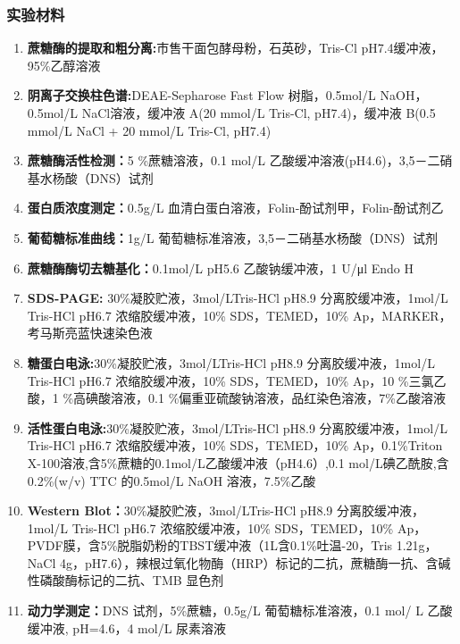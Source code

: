 \subsubsection{实验材料}
\begin{enumerate}
    \item \textbf{蔗糖酶的提取和粗分离:}市售干面包酵母粉，石英砂，Tris-Cl pH7.4缓冲液，95\%乙醇溶液
    \item \textbf{阴离子交换柱色谱:}DEAE-Sepharose Fast Flow 树脂，0.5mol/L NaOH，0.5mol/L NaCl溶液，缓冲液 A(20 mmol/L Tris-Cl, pH7.4)，缓冲液 B(0.5 mmol/L NaCl + 20 mmol/L Tris-Cl, pH7.4)
    \item \textbf{蔗糖酶活性检测：}5 \%蔗糖溶液，0.1 mol/L 乙酸缓冲溶液(pH4.6)，3,5－二硝基水杨酸（DNS）试剂
    \item \textbf{蛋白质浓度测定：}0.5g/L 血清白蛋白溶液，Folin-酚试剂甲，Folin-酚试剂乙
    \item \textbf{葡萄糖标准曲线：}1g/L 葡萄糖标准溶液，3,5－二硝基水杨酸（DNS）试剂
    \item \textbf{蔗糖酶酶切去糖基化：}0.1mol/L pH5.6 乙酸钠缓冲液，1 U/μl Endo H
    \item \textbf{SDS-PAGE:} 30\%凝胶贮液，3mol/LTris-HCl pH8.9 分离胶缓冲液，1mol/L Tris-HCl pH6.7 浓缩胶缓冲液，10\% SDS，TEMED，10\% Ap，MARKER，考马斯亮蓝快速染色液
    \item \textbf{糖蛋白电泳:}30\%凝胶贮液，3mol/LTris-HCl pH8.9 分离胶缓冲液，1mol/L Tris-HCl pH6.7 浓缩胶缓冲液，10\% SDS，TEMED，10\% Ap，10 \%三氯乙酸，1 \%高碘酸溶液，0.1 \%偏重亚硫酸钠溶液，品红染色溶液，7\%乙酸溶液
    \item \textbf{活性蛋白电泳:}30\%凝胶贮液，3mol/LTris-HCl pH8.9 分离胶缓冲液，1mol/L Tris-HCl pH6.7 浓缩胶缓冲液，10\% SDS，TEMED，10\% Ap，0.1\%Triton X-100溶液,含5\%蔗糖的0.1mol/L乙酸缓冲液（pH4.6）,0.1  mol/L碘乙酰胺,含0.2\%(w/v) TTC 的0.5mol/L  NaOH 溶液，7.5\%乙酸
    \item \textbf{Western Blot：}30\%凝胶贮液，3mol/LTris-HCl pH8.9 分离胶缓冲液，1mol/L Tris-HCl pH6.7 浓缩胶缓冲液，10\% SDS，TEMED，10\% Ap，PVDF膜，含5\%脱脂奶粉的TBST缓冲液（1L含0.1\%吐温-20，Tris 1.21g，NaCl 4g，pH7.6），辣根过氧化物酶（HRP）标记的二抗，蔗糖酶一抗、含碱性磷酸酶标记的二抗、TMB 显色剂
    \item \textbf{动力学测定：}DNS 试剂，5\%蔗糖，0.5g/L 葡萄糖标准溶液，0.1 mol/ L 乙酸缓冲液, pH=4.6，4 mol/L 尿素溶液
\end{enumerate}

